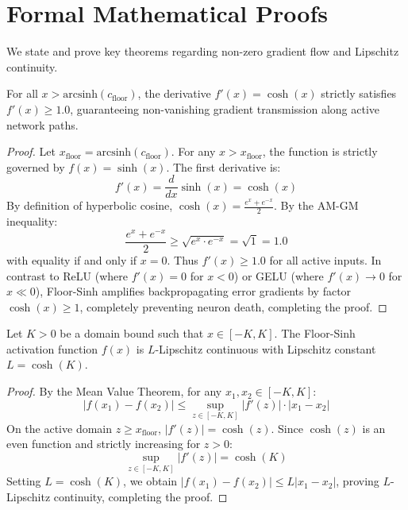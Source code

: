 \section{Formal Mathematical Proofs}

We state and prove key theorems regarding non-zero gradient flow and Lipschitz continuity.

\begin{theorem}
For all $x > \text{arcsinh}(c_{\text{floor}})$, the derivative $f'(x) = \cosh(x)$ strictly satisfies $f'(x) \ge 1.0$, guaranteeing non-vanishing gradient transmission along active network paths.
\end{theorem}

\begin{proof}
Let $x_{\text{floor}} = \text{arcsinh}(c_{\text{floor}})$. For any $x > x_{\text{floor}}$, the function is strictly governed by $f(x) = \sinh(x)$. The first derivative is:
\begin{equation}
f'(x) = \frac{d}{dx} \sinh(x) = \cosh(x)
\end{equation}
By definition of hyperbolic cosine, $\cosh(x) = \frac{e^x + e^{-x}}{2}$. By the AM-GM inequality:
\begin{equation}
\frac{e^x + e^{-x}}{2} \ge \sqrt{e^x \cdot e^{-x}} = \sqrt{1} = 1.0
\end{equation}
with equality if and only if $x = 0$. Thus $f'(x) \ge 1.0$ for all active inputs. In contrast to ReLU (where $f'(x) = 0$ for $x < 0$) or GELU (where $f'(x) \to 0$ for $x \ll 0$), Floor-Sinh amplifies backpropagating error gradients by factor $\cosh(x) \ge 1$, completely preventing neuron death, completing the proof.
\end{proof}

\begin{theorem}
Let $K > 0$ be a domain bound such that $x \in [-K, K]$. The Floor-Sinh activation function $f(x)$ is $L$-Lipschitz continuous with Lipschitz constant $L = \cosh(K)$.
\end{theorem}

\begin{proof}
By the Mean Value Theorem, for any $x_1, x_2 \in [-K, K]$:
\begin{equation}
|f(x_1) - f(x_2)| \le \sup_{z \in [-K, K]} |f'(z)| \cdot |x_1 - x_2|
\end{equation}
On the active domain $z \ge x_{\text{floor}}$, $|f'(z)| = \cosh(z)$. Since $\cosh(z)$ is an even function and strictly increasing for $z > 0$:
\begin{equation}
\sup_{z \in [-K, K]} |f'(z)| = \cosh(K)
\end{equation}
Setting $L = \cosh(K)$, we obtain $|f(x_1) - f(x_2)| \le L |x_1 - x_2|$, proving $L$-Lipschitz continuity, completing the proof.
\end{proof}
